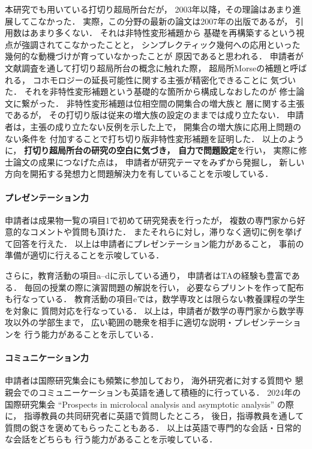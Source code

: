 \documentclass[11pt,a4paper,uplatex,dvipdfmx]{ujarticle} 		%
\newcommand{\研究課題名}{打切り超局所台を用いた層のフーリエ変換の研究とシンプレクティック幾何への応用}
\newcommand{\研究機関名}{北海道大学}
\newcommand{\研究代表者氏名}{大柴寿浩}
\begin{document}
本研究でも用いている打切り超局所台だが，
2003年以降，その理論はあまり進展してこなかった．
実際，この分野の最新の論文は2007年の出版であるが，
引用数はあまり多くない．
それは非特性変形補題から
基礎を再構築するという視点が強調されてこなかったことと，
シンプレクティック幾何への応用といった
幾何的な動機づけが育っていなかったことが
原因であると思われる．
申請者が文献調査を通して打切り超局所台の概念に触れた際，
超局所Morseの補題と呼ばれる，
コホモロジーの延長可能性に関する主張が精密化できることに
気づいた．
それを非特性変形補題という基礎的な箇所から構成しなおしたのが
修士論文に繋がった．
非特性変形補題は位相空間の開集合の増大族と
層に関する主張であるが，
その打切り版は従来の増大族の設定のままでは成り立たない．
申請者は，主張の成り立たない反例を示した上で，
開集合の増大族に応用上問題のない条件を
付加することで打ち切り版非特性変形補題を証明した．
以上のように，
\textbf{打切り超局所台の研究の空白に気づき，
自力で問題設定}を行い，
実際に修士論文の成果につなげた点は，
申請者が研究テーマをみずから発掘し，%
新しい方向を開拓する発想力と問題解決力を有していることを示唆している．
\paragraph*{プレゼンテーション力}
申請者は成果物一覧の項目1で初めて研究発表を行ったが，
複数の専門家から好意的なコメントや質問も頂けた．
またそれらに対し，滞りなく適切に例を挙げて回答を行えた．
以上は申請者にプレゼンテーション能力があること，
事前の準備が適切に行えることを示唆している．

さらに，教育活動の項目a--dに示している通り，
申請者はTAの経験も豊富である．
毎回の授業の際に演習問題の解説を行い，
必要ならプリントを作って配布も行なっている．
教育活動の項目eでは，数学専攻とは限らない教養課程の学生を対象に
質問対応を行なっている．
以上は，申請者が数学の専門家から数学専攻以外の学部生まで，
広い範囲の聴衆を相手に適切な説明・プレゼンテーションを
行う能力があることを示している．

\paragraph*{コミュニケーション力}
申請者は国際研究集会にも頻繁に参加しており，
海外研究者に対する質問や
懇親会でのコミュニーケーションも英語を通して積極的に行っている．
2024年の国際研究集会 ``Prospects in microlocal analysis
and asymptotic analysis'' の際に，
指導教員の共同研究者に英語で質問したところ，
後日，指導教員を通して
質問の鋭さを褒めてもらったこともある．
以上は英語で専門的な会話・日常的な会話をどちらも
行う能力があることを示唆している．
\end{document}
